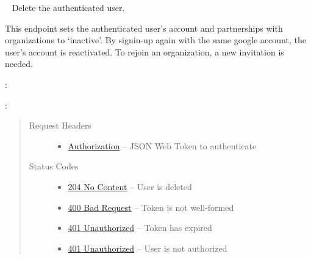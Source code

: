 \documentclass[letterpaper,10pt,english]{sphinxmanual}
\begin{document}
\begin{fulllineitems}
\label{\detokenize{resources/user:delete--me}}~
Delete the authenticated user.

This endpoint sets the authenticated user's account and partnerships
with organizations to `inactive'. By signin-up again with the same
google account, the user's account is reactivated. To rejoin an
organization, a new invitation is needed.

:

\begin{sphinxVerbatim}[commandchars=\\\{\}]
  
 
 
\end{sphinxVerbatim}

:

\begin{sphinxVerbatim}[commandchars=\\\{\}]
  
\end{sphinxVerbatim}
\begin{quote}\begin{description}
\item[{Request Headers}] \leavevmode\begin{itemize}
\item {} 
\href{http://tools.ietf.org/html/rfc7235\#section-4.2}{Authorization} -- JSON Web Token to authenticate

\end{itemize}

\item[{Status Codes}] \leavevmode\begin{itemize}
\item {} 
\href{http://www.w3.org/Protocols/rfc2616/rfc2616-sec10.html\#sec10.2.5}{204 No Content} -- User is deleted

\item {} 
\href{http://www.w3.org/Protocols/rfc2616/rfc2616-sec10.html\#sec10.4.1}{400 Bad Request} -- Token is not well-formed

\item {} 
\href{http://www.w3.org/Protocols/rfc2616/rfc2616-sec10.html\#sec10.4.2}{401 Unauthorized} -- Token has expired

\item {} 
\href{http://www.w3.org/Protocols/rfc2616/rfc2616-sec10.html\#sec10.4.2}{401 Unauthorized} -- User is not authorized

\end{itemize}

\end{description}\end{quote}

\end{fulllineitems}
\end{document}
